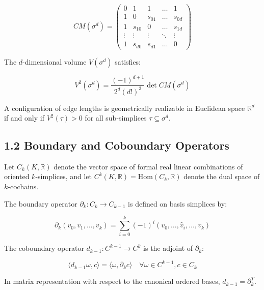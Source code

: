 \documentclass[11pt]{article}
\begin{document}
\begin{equation*}
CM(\sigma^d) = \begin{pmatrix}
0 & 1 & 1 & \dots & 1 \\
1 & 0 & s_{01} & \dots & s_{0d} \\
1 & s_{10} & 0 & \dots & s_{1d} \\
\vdots & \vdots & \vdots & \ddots & \vdots \\
1 & s_{d0} & s_{d1} & \dots & 0
\end{pmatrix}
\end{equation*}

The $d$-dimensional volume $V(\sigma^d)$ satisfies:

\begin{equation*}
V^2(\sigma^d) = \frac{(-1)^{d+1}}{2^d (d!)^2} \det CM(\sigma^d)
\end{equation*}

A configuration of edge lengths is geometrically realizable in Euclidean space $\mathbb{R}^d$ if and only if $V^2(\tau) > 0$ for all sub-simplices $\tau \subseteq \sigma^d$.

\subsection{\texorpdfstring{1.2 Boundary and Coboundary Operators}{1.2 Boundary and Coboundary Operators}}

Let $C_k(K, \mathbb{R})$ denote the vector space of formal real linear combinations of oriented $k$-simplices, and let $C^k(K, \mathbb{R}) = \mathrm{Hom}(C_k, \mathbb{R})$ denote the dual space of $k$-cochains.

The boundary operator $\partial_k: C_k \to C_{k-1}$ is defined on basis simplices by:

\begin{equation*}
\partial_k (v_0, v_1, \dots, v_k) = \sum_{i=0}^k (-1)^i (v_0, \dots, \hat{v}_i, \dots, v_k)
\end{equation*}

The coboundary operator $d_{k-1}: C^{k-1} \to C^k$ is the adjoint of $\partial_k$:

\begin{equation*}
\langle d_{k-1} \omega, c \rangle = \langle \omega, \partial_k c \rangle \quad \forall \omega \in C^{k-1}, c \in C_k
\end{equation*}

In matrix representation with respect to the canonical ordered bases, $d_{k-1} = \partial_k^T$.
\end{document}
